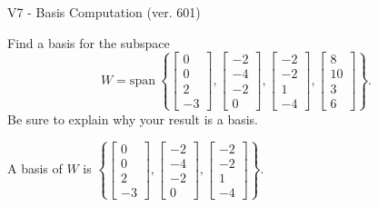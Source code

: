 \begin{exercise}
  \begin{exerciseTitle}V7 - Basis Computation (ver. 601)\end{exerciseTitle}
  \begin{exerciseStatement}
    Find a basis for the subspace 
\[W=\mathrm{span}\ \left\{\left[\begin{array}{r}
0 \\
0 \\
2 \\
-3
\end{array}\right] , \left[\begin{array}{r}
-2 \\
-4 \\
-2 \\
0
\end{array}\right] , \left[\begin{array}{r}
-2 \\
-2 \\
1 \\
-4
\end{array}\right] , \left[\begin{array}{r}
8 \\
10 \\
3 \\
6
\end{array}\right]\right\}.\]
 Be sure to explain why your result is a basis.


  \end{exerciseStatement}
  \begin{exerciseAnswer}
   A basis of \(W\) is  \(\left\{\left[\begin{array}{r}
0 \\
0 \\
2 \\
-3
\end{array}\right] , \left[\begin{array}{r}
-2 \\
-4 \\
-2 \\
0
\end{array}\right] , \left[\begin{array}{r}
-2 \\
-2 \\
1 \\
-4
\end{array}\right]\right\}\).
  


  \end{exerciseAnswer}
\end{exercise}